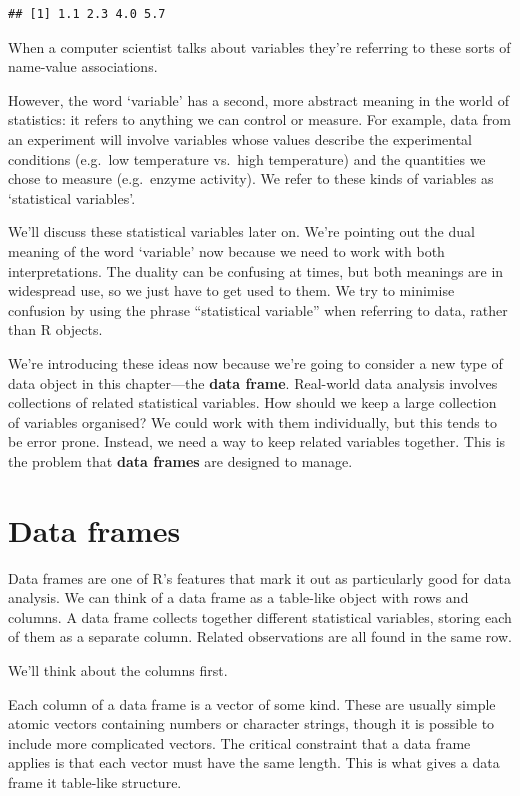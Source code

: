 \documentclass[
]{book}
\begin{document}
\begin{verbatim}
## [1] 1.1 2.3 4.0 5.7
\end{verbatim}

When a computer scientist talks about variables they're referring to these sorts of name-value associations.

However, the word `variable' has a second, more abstract meaning in the world of statistics: it refers to anything we can control or measure. For example, data from an experiment will involve variables whose values describe the experimental conditions (e.g.~low temperature vs.~high temperature) and the quantities we chose to measure (e.g.~enzyme activity). We refer to these kinds of variables as `statistical variables'.

We'll discuss these statistical variables later on. We're pointing out the dual meaning of the word `variable' now because we need to work with both interpretations. The duality can be confusing at times, but both meanings are in widespread use, so we just have to get used to them. We try to minimise confusion by using the phrase ``statistical variable'' when referring to data, rather than R objects.

We're introducing these ideas now because we're going to consider a new type of data object in this chapter---the \textbf{data frame}. Real-world data analysis involves collections of related statistical variables. How should we keep a large collection of variables organised? We could work with them individually, but this tends to be error prone. Instead, we need a way to keep related variables together. This is the problem that \textbf{data frames} are designed to manage.

\hypertarget{data-frames-intro}{%
\section{Data frames}\label{data-frames-intro}}

Data frames are one of R's features that mark it out as particularly good for data analysis. We can think of a data frame as a table-like object with rows and columns. A data frame collects together different statistical variables, storing each of them as a separate column. Related observations are all found in the same row.

We'll think about the columns first.

Each column of a data frame is a vector of some kind. These are usually simple atomic vectors containing numbers or character strings, though it is possible to include more complicated vectors. The critical constraint that a data frame applies is that each vector must have the same length. This is what gives a data frame it table-like structure.
\end{document}

